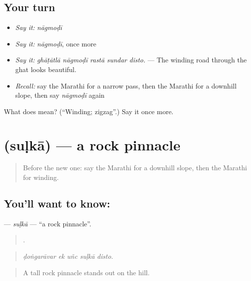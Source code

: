 \subsection*{Your turn}
\begin{itemize}
\raggedright
  \item \emph{Say it:} \emph{nāgmoḍī}
  \item \emph{Say it:} \emph{nāgmoḍī}, once more
  \item \emph{Say it:} \emph{ghāṭātlā nāgmoḍī rastā sundar disto.} — The winding road through the ghat looks beautiful.
  \item \emph{Recall:} say the Marathi for a narrow pass, then the Marathi for a downhill slope, then say \emph{nāgmoḍī} again
\end{itemize}

\begin{tcolorbox}[breakable,colback=teal!4,colframe=teal!35!black,title={Before you move on}]
What does  mean? (\textquotedblleft{}Winding; zigzag\textquotedblright{}.) Say it once more.
\end{tcolorbox}
\section[\texorpdfstring{\mr{सुळका} (suḷkā)}{सुळका (suḷkā)}]{ (suḷkā) — a rock pinnacle}

\label{lesson:MR-C402-sulka}



\begin{quote}
Before the new one: say the Marathi for a downhill slope, then the Marathi for winding.
\end{quote}

\subsection*{You'll want to know: }
\textbf{} — \emph{suḷkā} — \textquotedblleft{}a rock pinnacle\textquotedblright{}.

\begin{quote}
    .
\end{quote}

\begin{quote}
\emph{ḍoṅgarāvar ek uñc suḷkā disto.}
\end{quote}

\begin{quote}
A tall rock pinnacle stands out on the hill.
\end{quote}

